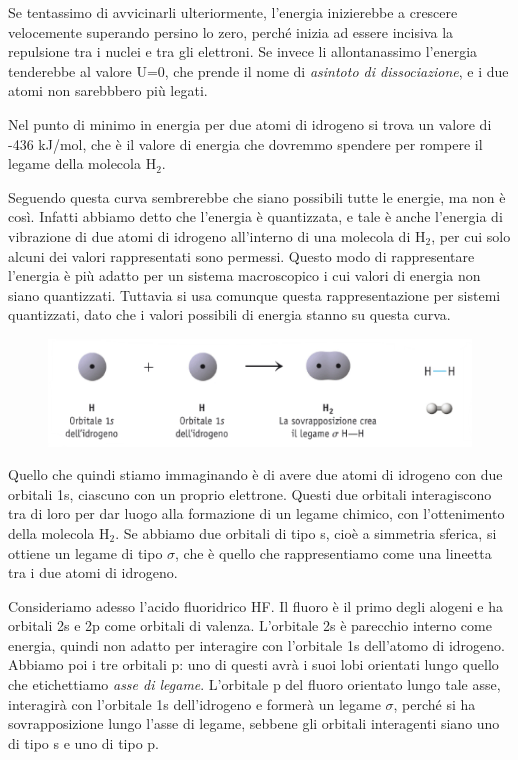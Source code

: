 Se tentassimo di avvicinarli ulteriormente, l'energia inizierebbe a crescere velocemente superando persino lo zero, perché inizia ad essere incisiva la repulsione tra i nuclei e tra gli elettroni. Se invece li allontanassimo l'energia tenderebbe al valore U=0, che prende il nome di \textit{asintoto di dissociazione}, e i due atomi non sarebbbero più legati.

Nel punto di minimo in energia per due atomi di idrogeno si trova un valore di -436 kJ/mol, che è il valore di energia che dovremmo spendere per rompere il legame della molecola H$_2$.

\vspace{0.2cm}Seguendo questa curva sembrerebbe che siano possibili tutte le energie, ma non è così. Infatti abbiamo detto che l'energia è quantizzata, e tale è anche l'energia di vibrazione di due atomi di idrogeno all'interno di una molecola di H$_2$, per cui solo alcuni dei valori rappresentati sono permessi. Questo modo di rappresentare l'energia è più adatto per un sistema macroscopico i cui valori di energia non siano quantizzati. Tuttavia si usa comunque questa rappresentazione per sistemi quantizzati, dato che i valori possibili di energia stanno su questa curva.

\vspace{-0.3cm}\begin{figure}[htp]
    \centering
    \includegraphics[width=12cm]{immagini/legame-H_2.png}
\end{figure}

\vspace{-0.5cm}Quello che quindi stiamo immaginando è di avere due atomi di idrogeno con due orbitali 1s, ciascuno con un proprio elettrone. Questi due orbitali interagiscono tra di loro per dar luogo alla formazione di un legame chimico, con l'ottenimento della molecola H$_2$. Se abbiamo due orbitali di tipo s, cioè a simmetria sferica, si ottiene un legame di tipo $\sigma$, che è quello che rappresentiamo come una lineetta tra i due atomi di idrogeno. 

\vspace{0.2cm}Consideriamo adesso l'acido fluoridrico HF. Il fluoro è il primo degli alogeni e ha orbitali 2s e 2p come orbitali di valenza. L'orbitale 2s è parecchio interno come energia, quindi non adatto per interagire con l'orbitale 1s dell'atomo di idrogeno. Abbiamo poi i tre orbitali p: uno di questi avrà i suoi lobi orientati lungo quello che etichettiamo \textit{asse di legame}. L'orbitale p del fluoro orientato lungo tale asse, interagirà con l'orbitale 1s dell'idrogeno e formerà un legame $\sigma$, perché si ha sovrapposizione lungo l'asse di legame, sebbene gli orbitali interagenti siano uno di tipo s e uno di tipo p.

